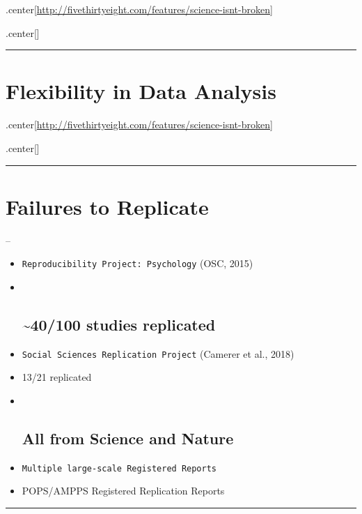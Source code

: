 \documentclass[]{article}
\begin{document}
.center{[}\url{http://fivethirtyeight.com/features/science-isnt-broken}{]}

.center{[}{]}

\begin{center}\rule{0.5\linewidth}{\linethickness}\end{center}

\section{Flexibility in Data
Analysis}\label{flexibility-in-data-analysis-2}

.center{[}\url{http://fivethirtyeight.com/features/science-isnt-broken}{]}

.center{[}{]}

\begin{center}\rule{0.5\linewidth}{\linethickness}\end{center}

\section{Failures to Replicate}\label{failures-to-replicate}

--

\begin{itemize}
\item
  \texttt{Reproducibility\ Project:\ Psychology} (OSC, 2015)\\
\item ~
  \subsection{\textasciitilde{}40/100 studies
  replicated}\label{studies-replicated}
\item
  \texttt{Social\ Sciences\ Replication\ Project} (Camerer et al., 2018)
\item
  13/21 replicated
\item ~
  \subsection{All from Science and
  Nature}\label{all-from-science-and-nature}
\item
  \texttt{Multiple\ large-scale\ Registered\ Reports}
\item
  POPS/AMPPS Registered Replication Reports
\end{itemize}

\begin{center}\rule{0.5\linewidth}{\linethickness}\end{center}
\end{document}
